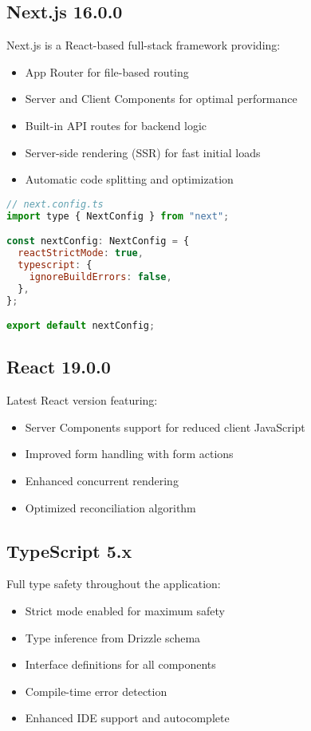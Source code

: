 \documentclass[12pt,a4paper]{report}
\begin{document}
\subsection{Next.js 16.0.0}

Next.js is a React-based full-stack framework providing:

\begin{itemize}
    \item App Router for file-based routing
    \item Server and Client Components for optimal performance
    \item Built-in API routes for backend logic
    \item Server-side rendering (SSR) for fast initial loads
    \item Automatic code splitting and optimization
\end{itemize}

\begin{lstlisting}[language=JavaScript, caption=Next.js Configuration]
// next.config.ts
import type { NextConfig } from "next";

const nextConfig: NextConfig = {
  reactStrictMode: true,
  typescript: {
    ignoreBuildErrors: false,
  },
};

export default nextConfig;
\end{lstlisting}

\subsection{React 19.0.0}

Latest React version featuring:
\begin{itemize}
    \item Server Components support for reduced client JavaScript
    \item Improved form handling with form actions
    \item Enhanced concurrent rendering
    \item Optimized reconciliation algorithm
\end{itemize}

\subsection{TypeScript 5.x}

Full type safety throughout the application:
\begin{itemize}
    \item Strict mode enabled for maximum safety
    \item Type inference from Drizzle schema
    \item Interface definitions for all components
    \item Compile-time error detection
    \item Enhanced IDE support and autocomplete
\end{itemize}
\end{document}

